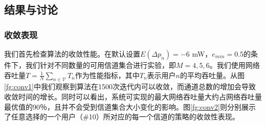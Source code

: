 
\subsection{结果与讨论}
\subsubsection{收敛表现}
我们首先检查算法的收敛性能。在默认设置$E(\Delta p_n)=-6$ mW，$e_{min}=0.5$的条件下，我们针对不同数量的可用信道集合进行实验，即$M=4,5,6$。我们使用网络吞吐量$T=\frac{1}{N}\sum_{n\in\mathcal{V}}T_n$作为性能指标，其中$T_n$表示用户$n$的平均吞吐量。从图\ref{fg:conv1}中我们观察到算法在1500次迭代内可以收敛，而通道总数的增加会导致收敛时间的增长。同时可以看出，系统可实现的最大网络吞吐量大约占网络吞吐量最优值的90％，且并不会受到信道集合大小变化的影响。图\ref{fg:conv2}则分别展示了任意选择的一个用户（\#10）所对应的每一个信道的策略的收敛性表现。

